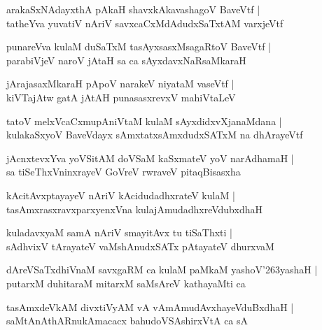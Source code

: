 \documentclass[twoside,12pt,openright]{book}
\def\S{\char'263}
\newcounter{shloka}[chapter]
\begin{document}
\begin{shloka}%
arakaSxNAdayxthA pAkaH shavxkAkavashagoV BaveVtf |\\
tatheYva yuvatiV nAriV savxcaCxMdAdudxSaTxtAM varxjeVtf
\end{shloka}

\begin{shloka}%
punareVva kulaM duSaTxM tasAyxsasxMsagaRtoV BaveVtf |\\
parabiVjeV naroV jAtaH sa ca sAyxdavxNaRsaMkaraH 
\end{shloka}

\begin{shloka}%
jArajasaxMkaraH pApoV narakeV niyataM vaseVtf |\\
kiVTajAtw gatA jAtAH punasasxrevxV mahiVtaLeV 
\end{shloka}

\begin{shloka}%
tatoV melxVcaCxmupAniVtaM kulaM sAyxdidxvXjanaMdana |\\
kulakaSxyoV BaveVdayx sAmxtatxsAmxdudxSATxM na dhArayeVtf
\end{shloka}

\begin{shloka}%
jAcnxtevxYva yoVSitAM doVSaM kaSxmateV yoV narAdhamaH |\\
sa tiSeThxVninxrayeV GoVreV rwraveV pitaqBisasxha
\end{shloka}

\begin{shloka}%
kAcitAvxptayayeV nAriV kAcidudadhxrateV kulaM |\\
tasAmxrasxravxparxyenxVna kulajAmudadhxreVdubxdhaH 
\end{shloka}

\begin{shloka}%
kuladavxyaM samA nAriV smayitAvx tu tiSaThxti |\\
sAdhvixV tArayateV vaMshAnudxSATx pAtayateV dhurxvaM 
\end{shloka}

\begin{shloka}%
dAreVSaTxdhiVnaM savxgaRM ca kulaM paMkaM yashoV\S yashaH |\\
putarxM duhitaraM mitarxM saMsAreV kathayaMti ca 
\end{shloka}

\begin{shloka}%
tasAmxdeVkAM divxtiVyAM vA vAmAmudAvxhayeVduBxdhaH |\\
saMtAnAthARnukAmacacx bahudoVSAshirxVtA ca sA 
\end{shloka}
\end{document}
